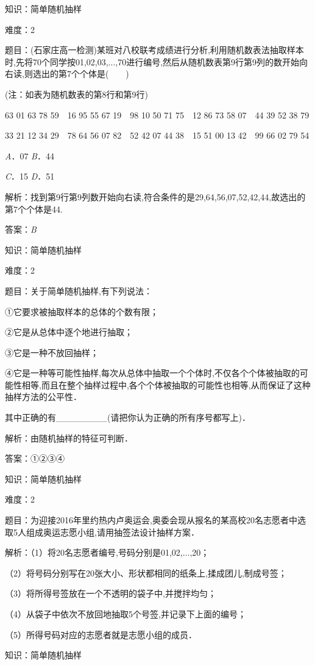 \documentclass{article} %
\begin{document}
知识：简单随机抽样

难度：2

题目：(石家庄高一检测)某班对八校联考成绩进行分析,利用随机数表法抽取样本时,先将70个同学按01,02,03,$\dots$,70进行编号,然后从随机数表第9行第9列的数开始向右读,则选出的第7个个体是(　　)

(注：如表为随机数表的第8行和第9行)

63 01 63 78 59　16 95 55 67 19　98 10 50 71 75　12 86 73 58 07　44 39 52 38 79

33 21 12 34 29　78 64 56 07 82　52 42 07 44 38　15 51 00 13 42　99 66 02 79 54

\textit{A}．07  \textit{B}．44

\textit{C}．15  \textit{D}．51

解析：找到第9行第9列数开始向右读,符合条件的是29,64,56,07,52,42,44,故选出的第7个个体是44.

答案：\textit{B}

知识：简单随机抽样

难度：2

题目：关于简单随机抽样,有下列说法：

①它要求被抽取样本的总体的个数有限；

②它是从总体中逐个地进行抽取；

③它是一种不放回抽样；

④它是一种等可能性抽样,每次从总体中抽取一个个体时,不仅各个个体被抽取的可能性相等,而且在整个抽样过程中,各个个体被抽取的可能性也相等,从而保证了这种抽样方法的公平性．

其中正确的有\_\_\_\_\_\_\_\_(请把你认为正确的所有序号都写上)．

解析：由随机抽样的特征可判断．

答案：①②③④

知识：简单随机抽样

难度：2

题目：为迎接2016年里约热内卢奥运会,奥委会现从报名的某高校20名志愿者中选取5人组成奥运志愿小组,请用抽签法设计抽样方案．

解析：（1）将20名志愿者编号,号码分别是01,02,$\dots$,20；

（2）将号码分别写在20张大小、形状都相同的纸条上,揉成团儿,制成号签；

（3）将所得号签放在一个不透明的袋子中,并搅拌均匀；

（4）从袋子中依次不放回地抽取5个号签,并记录下上面的编号；

（5）所得号码对应的志愿者就是志愿小组的成员．

知识：简单随机抽样
\end{document}
